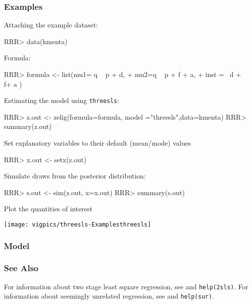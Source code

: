 \subsubsection{Examples}
Attaching the example dataset:
\begin{Schunk}
\begin{Sinput}
RRR>    data(kmenta)
\end{Sinput}
\end{Schunk}
 Formula:
\begin{Schunk}
\begin{Sinput}
RRR>  formula <- list(mu1= q ~ p + d,
+                 mu2=q ~ p + f + a,
+                 inst =~ d + f+ a )
\end{Sinput}
\end{Schunk}
Estimating the model using \texttt{threesls}:
\begin{Schunk}
\begin{Sinput}
RRR>  z.out <- zelig(formula=formula, model ="threesls",data=kmenta)
RRR>  summary(z.out)
\end{Sinput}
\end{Schunk}

Set explanatory variables to their default (mean/mode) values
\begin{Schunk}
\begin{Sinput}
RRR>  x.out <- setx(z.out)
\end{Sinput}
\end{Schunk}

Simulate draws from the posterior distribution:
\begin{Schunk}
\begin{Sinput}
RRR>  s.out <- sim(z.out, x=x.out)
RRR>  summary(s.out)
\end{Sinput}
\end{Schunk}
Plot the quantities of interest
\begin{center}
\texttt{[image: vigpics/threesls-Examplesthreesls]}
\end{center}
\clearpage

\subsubsection{Model}
\subsubsection{See Also}
For information about two stage least square regression, see 
 and \texttt{help(2sls)}.
For information about seemingly unrelated regression, see
 and \texttt{help(sur)}.
